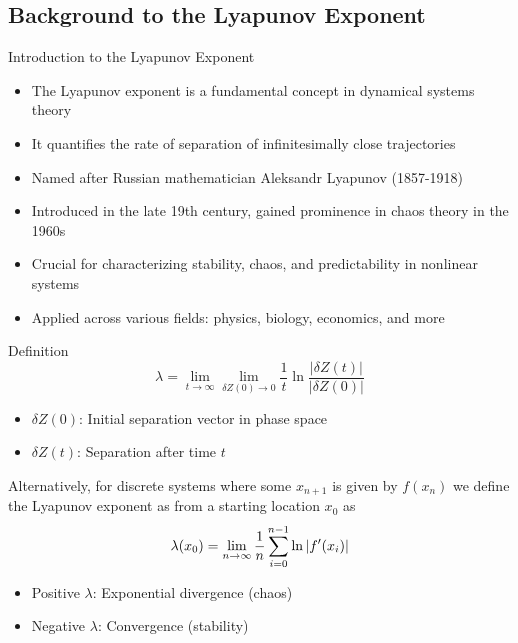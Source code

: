 \documentclass{beamer}
\begin{document}
\subsection{Background to the Lyapunov Exponent}
\begin{frame}{Introduction to the Lyapunov Exponent}
\begin{itemize}
    \item The Lyapunov exponent is a fundamental concept in dynamical systems theory
    \item It quantifies the rate of separation of infinitesimally close trajectories
    \item Named after Russian mathematician Aleksandr Lyapunov (1857-1918)
    \item Introduced in the late 19th century, gained prominence in chaos theory in the 1960s
    \item Crucial for characterizing stability, chaos, and predictability in nonlinear systems
    \item Applied across various fields: physics, biology, economics, and more
\end{itemize}
\end{frame}

\begin{frame}{Definition}
\begin{equation}
    \lambda = \lim_{t \to \infty} \lim_{\delta Z(0) \to 0} \frac{1}{t} \ln \frac{|\delta Z(t)|}{|\delta Z(0)|}
\end{equation}
\begin{itemize}
    \item $\delta Z(0)$: Initial separation vector in phase space
    \item $\delta Z(t)$: Separation after time $t$
\end{itemize}
Alternatively, for discrete systems where some $x_{n+1}$ is given by $f(x_n)$ we define the Lyapunov exponent as from a starting location $x_0$ as
\begin{equation}
    \lambda(x_0) = \lim_{n \to \infty} \frac{1}{n}\sum_{i=0}^{n-1}\ln \abs{f'(x_i)}
\end{equation}
\begin{itemize}
    \item Positive $\lambda$: Exponential divergence (chaos)
    \item Negative $\lambda$: Convergence (stability)
\end{itemize}
\end{frame}
\end{document}
